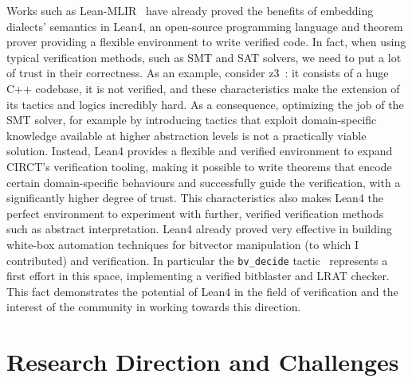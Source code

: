 \documentclass[sigconf,authorversion,nonacm, 11pt]{acmart}
\begin{document}
Works such as Lean-MLIR~\cite{bhat2024verifying} have already proved the benefits 
of embedding dialects' semantics in Lean4, an open-source programming language and theorem prover providing a flexible environment to write verified code. 
In fact, when using typical verification methods, such as SMT and SAT solvers, we need to put a lot of trust in their correctness. 
As an example, consider z3~\cite{de2008z3}: it consists of a huge C++ codebase, it is not verified, and these characteristics make the extension
of its tactics and logics incredibly hard. 
As a consequence, optimizing the job of the SMT solver, for example by introducing tactics that exploit domain-specific knowledge available at 
higher abstraction levels is not a practically viable solution. %
Instead, Lean4 provides a flexible and verified environment to expand CIRCT's verification tooling, 
making it possible to write theorems that encode certain domain-specific behaviours and successfully guide the verification, 
with a significantly higher degree of trust. 
This characteristics also makes Lean4 the perfect environment to experiment with further, verified verification 
methods such as abstract interpretation.
Lean4 already proved very effective in building white-box automation techniques for bitvector manipulation (to which I contributed)
and verification. 
In particular the \texttt{bv\_decide} tactic~\cite{bvdecide} represents a first effort in this space, implementing a verified bitblaster and 
LRAT checker. 
This fact demonstrates the potential of Lean4 in the field of verification and the interest of the community in working towards this direction. 

\section{Research Direction and Challenges}
\end{document}
